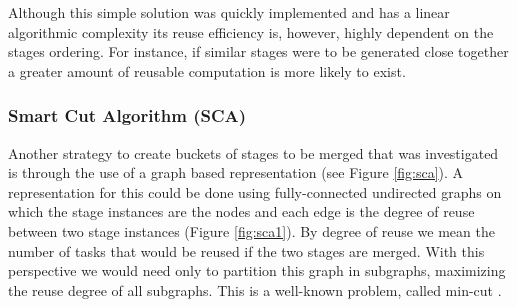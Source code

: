 
Although this simple solution was quickly implemented and has a linear algorithmic complexity its reuse efficiency is, however, highly dependent on the stages ordering. For instance, if similar stages were to be generated close together a greater amount of reusable computation is more likely to exist.


\subsubsection{Smart Cut Algorithm (SCA)}
\label{sec:sca}

Another strategy to create buckets of stages to be merged that was investigated is through the use of a graph based representation (see Figure \ref{fig:sca}). A representation for this could be done using fully-connected undirected graphs on which the stage instances are the nodes and each edge is the degree of reuse between two stage instances (Figure \ref{fig:sca1}). By degree of reuse we mean the number of tasks that would be reused if the two stages are merged. With this perspective we would need only to partition this graph in subgraphs, maximizing the reuse degree of all subgraphs. This is a well-known problem, called min-cut \cite{mincut}. 

